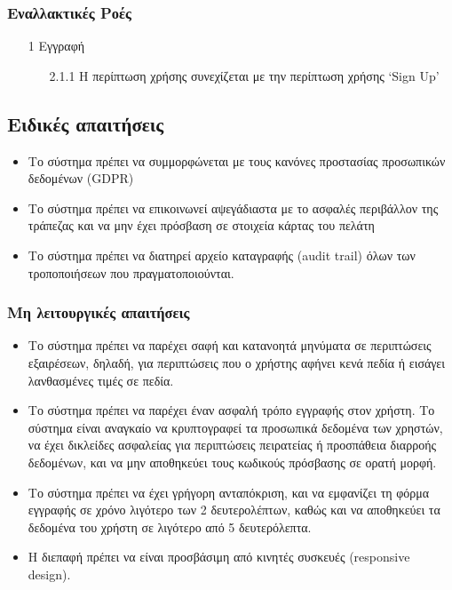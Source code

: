 \documentclass[12pt,a4paper,twoside]{book}
\begin{document}
\subsubsection{Εναλλακτικές Ροές}
\begin{enumerate}
  \item[1 ] Εγγραφή %
        \begin{enumerate}
          \item[2.1.1 ] Η περίπτωση χρήσης συνεχίζεται με την περίπτωση χρήσης `Sign Up' %
        \end{enumerate}
\end{enumerate}

\subsection{Ειδικές απαιτήσεις} %
\begin{itemize}
  \item Το σύστημα πρέπει να συμμορφώνεται με τους κανόνες προστασίας προσωπικών δεδομένων (GDPR)  %
  \item Το σύστημα πρέπει να επικοινωνεί αψεγάδιαστα με το ασφαλές περιβάλλον της τράπεζας και να μην έχει πρόσβαση σε στοιχεία κάρτας του πελάτη   %
  \item Το σύστημα πρέπει να διατηρεί αρχείο καταγραφής (audit trail) όλων των τροποποιήσεων που πραγματοποιούνται. %
\end{itemize}

\subsubsection{Μη λειτουργικές απαιτήσεις}
\begin{itemize}
  \item Το σύστημα πρέπει να παρέχει σαφή και κατανοητά μηνύματα σε περιπτώσεις εξαιρέσεων, δηλαδή, για περιπτώσεις που ο χρήστης αφήνει κενά πεδία ή εισάγει λανθασμένες τιμές σε πεδία.%
  \item Το σύστημα πρέπει να παρέχει έναν ασφαλή τρόπο εγγραφής στον χρήστη. Το σύστημα είναι αναγκαίο να κρυπτογραφεί τα προσωπικά δεδομένα των χρηστών, να έχει δικλείδες ασφαλείας για περιπτώσεις πειρατείας ή προσπάθεια διαρροής δεδομένων, και να μην αποθηκεύει τους κωδικούς πρόσβασης σε ορατή μορφή. %
  \item Το σύστημα πρέπει να έχει γρήγορη ανταπόκριση, και να εμφανίζει τη φόρμα εγγραφής σε χρόνο λιγότερο των 2 δευτερολέπτων, καθώς και να αποθηκεύει τα δεδομένα του χρήστη σε λιγότερο από 5 δευτερόλεπτα. %
  \item Η διεπαφή πρέπει να είναι προσβάσιμη από κινητές συσκευές (responsive design). %
\end{itemize}
\end{document}
